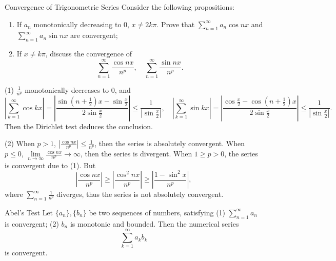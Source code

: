 \begin{example}{Convergence of Trigonometric Series}{}
  Consider the following propositions:
  \begin{enumerate}
  \item If $a_n$ monotonically decreasing to $0$, $x \neq 2k\pi$.
    Prove that $\sum\limits_{n = 1}^{\infty} a_n \cos nx$ and $\sum\limits_{n =
      1}^{\infty} a_n \sin nx$ are convergent;
  \item If $x \neq k\pi$, discuss the convergence of
    \begin{equation}
      \sum\limits_{n = 1}^{\infty} \frac{\cos nx}{n^p}, \quad
      \sum\limits_{n = 1}^{\infty} \frac{\sin nx}{n^p}.
    \end{equation}
  \end{enumerate}
\end{example}

\begin{solution}
  (1) $\frac{1}{n^p}$ monotonically decreases to $0$, and
  \begin{equation}
    \left|\sum\limits_{k = 1}^{\infty} \cos kx\right|
    = \left|\frac{\sin (n + \frac{1}{2})x - \sin \frac{x}{2}}{2 \sin \frac{x}{2}}\right|
    \leq \frac{1}{|\sin \frac{x}{2}|}, \quad
    \left|\sum\limits_{k = 1}^{\infty} \sin kx \right|
    = \left| \frac{\cos \frac{x}{2} - \cos (n + \frac{1}{2})x}{2 \sin \frac{x}{2}} \right|
    \leq \frac{1}{|\sin \frac{x}{2}|}.
  \end{equation}
  Then the Dirichlet test deduces the conclusion.

  (2) When $p > 1$, $\left| \frac{\cos nx}{n^p} \right| \leq \frac{1}{n^p}$,
  then the series is absolutely convergent.
  When $p \leq 0$, $\lim \limits _{n \rightarrow \infty} \frac{\cos nx}{n^p}
  \rightarrow \infty$, then the series is divergent.
  When $1 \geq p > 0$, the series is convergent due to (1).
  But 
  \begin{equation}
    \left| \frac{\cos nx}{n^p} \right|
    \geq \left| \frac{\cos^2 nx}{n^p} \right|
    \geq \left| \frac{1 - \sin^2 x}{n^p} \right|,
  \end{equation}
  where $\sum\limits_{n = 1}^{\infty} \frac{1}{n^p}$ diverges,
  thus the series is not absolutely convergent.
\end{solution}

\begin{theorem}{Abel's Test}{}
  Let $\{a_n\}, \{b_n\}$ be two sequences of numbers,
  satisfying
  (1) $\sum\limits_{n = 1}^{\infty}a_n$ is convergent;
  (2) $b_n$ is monotonic and bounded.
  Then the numerical series
  \begin{equation}
    \sum\limits_{k = 1}^{\infty} a_kb_k
  \end{equation}
  is convergent.
\end{theorem}

